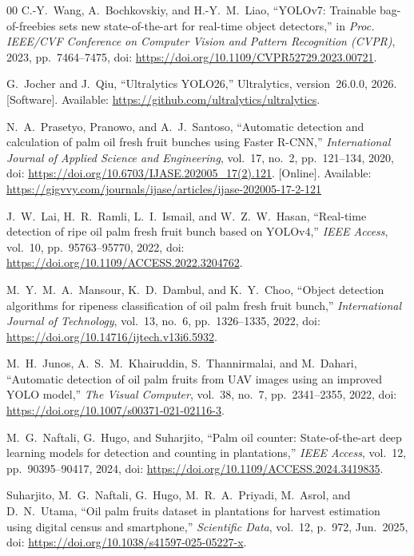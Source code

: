 ﻿\documentclass[conference]{IEEEtran}
\begin{document}
\begin{thebibliography}{00}
C.-Y.~Wang, A.~Bochkovskiy, and H.-Y.~M.~Liao,
``YOLOv7: Trainable bag-of-freebies sets new state-of-the-art for real-time
object detectors,''
in \textit{Proc. IEEE/CVF Conference on Computer Vision and Pattern
Recognition (CVPR)}, 2023, pp.~7464--7475,
doi: \url{https://doi.org/10.1109/CVPR52729.2023.00721}.

G.~Jocher and J.~Qiu,
``Ultralytics YOLO26,'' Ultralytics, version~26.0.0, 2026. [Software].
Available: \url{https://github.com/ultralytics/ultralytics}.

N.~A.~Prasetyo, Pranowo, and A.~J.~Santoso,
``Automatic detection and calculation of palm oil fresh fruit bunches using
Faster R-CNN,''
\textit{International Journal of Applied Science and Engineering}, vol.~17,
no.~2, pp.~121--134, 2020, doi:
\url{https://doi.org/10.6703/IJASE.202005_17(2).121}. [Online]. Available:
\url{https://gigvvy.com/journals/ijase/articles/ijase-202005-17-2-121}

J.~W.~Lai, H.~R.~Ramli, L.~I.~Ismail, and W.~Z.~W.~Hasan,
``Real-time detection of ripe oil palm fresh fruit bunch based on YOLOv4,''
\textit{IEEE Access}, vol.~10, pp.~95763--95770, 2022,
doi: \url{https://doi.org/10.1109/ACCESS.2022.3204762}.

M.~Y.~M.~A.~Mansour, K.~D.~Dambul, and K.~Y.~Choo,
``Object detection algorithms for ripeness classification of oil palm fresh
fruit bunch,''
\textit{International Journal of Technology}, vol.~13, no.~6,
pp.~1326--1335, 2022, doi: \url{https://doi.org/10.14716/ijtech.v13i6.5932}.

M.~H.~Junos, A.~S.~M.~Khairuddin, S.~Thannirmalai, and M.~Dahari,
``Automatic detection of oil palm fruits from UAV images using an improved
YOLO model,''
\textit{The Visual Computer}, vol.~38, no.~7, pp.~2341--2355, 2022,
doi: \url{https://doi.org/10.1007/s00371-021-02116-3}.

M.~G.~Naftali, G.~Hugo, and Suharjito,
``Palm oil counter: State-of-the-art deep learning models for detection and
counting in plantations,''
\textit{IEEE Access}, vol.~12, pp.~90395--90417, 2024,
doi: \url{https://doi.org/10.1109/ACCESS.2024.3419835}.

Suharjito, M.~G.~Naftali, G.~Hugo, M.~R.~A.~Priyadi, M.~Asrol, and
D.~N.~Utama,
``Oil palm fruits dataset in plantations for harvest estimation using digital
census and smartphone,''
\textit{Scientific Data}, vol.~12, p.~972, Jun.~2025,
doi: \url{https://doi.org/10.1038/s41597-025-05227-x}.


\end{thebibliography}
\end{document}
